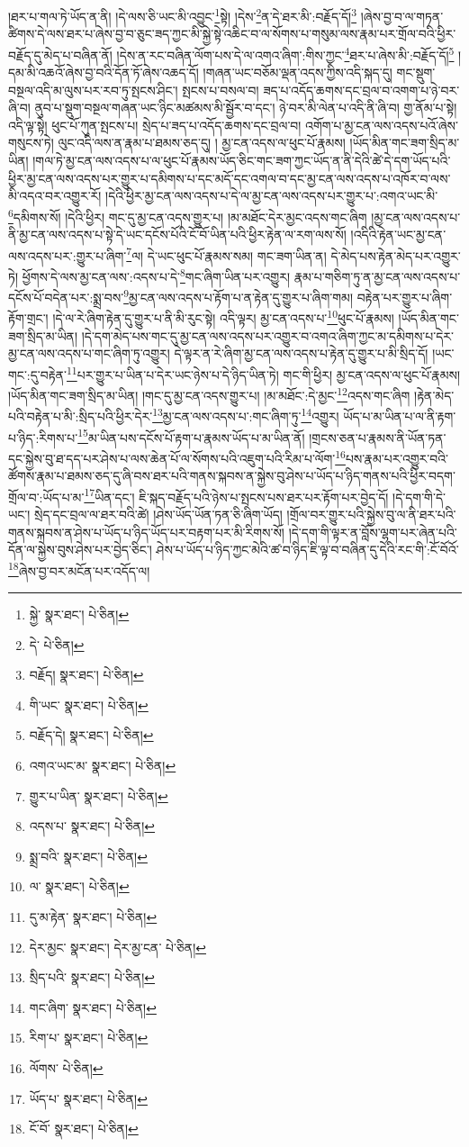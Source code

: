 །ཐར་པ་གལ་ཏེ་ཡོད་ན་ནི། །དེ་ལས་ཅི་ཡང་མི་འབྱུང་\footnote{སྐྱེ་  སྣར་ཐང་།  པེ་ཅིན། }སྟེ། །དེས་\footnote{དེ་  པེ་ཅིན། }ན་དེ་ཐར་མི་:བརྗོད་དོ།\footnote{བརྗོད།  སྣར་ཐང་།  པེ་ཅིན། } །ཞེས་བྱ་བ་ལ་གཏན་ཚིགས་དེ་ལས་ཐར་པ་ཞེས་བྱ་བ་ཅུང་ཟད་ཀྱང་མི་སྐྱེ་སྟེ་འཆིང་བ་ལ་སོགས་པ་གསུམ་ལས་རྣམ་པར་གྲོལ་བའི་ཕྱིར་བརྗོད་དུ་མེད་པ་བཞིན་ནོ། །དེས་ན་རང་བཞིན་ལོག་པས་དེ་ལ་འགའ་ཞིག་:གིས་ཀྱང་\footnote{གི་ཡང་  སྣར་ཐང་།  པེ་ཅིན། }ཐར་པ་ཞེས་མི་:བརྗོད་དོ།\footnote{བརྗོད་དེ།  སྣར་ཐང་།  པེ་ཅིན། } །དམ་མི་འཆའོ་ཞེས་བྱ་བའི་དོན་ཏོ་ཞེས་འཆད་དོ། །གཞན་ཡང་བཅོམ་ལྡན་འདས་ཀྱིས་འདི་སྐད་དུ། གང་སྡུག་བསྔལ་འདི་མ་ལུས་པར་རབ་ཏུ་སྤངས་ཤིང་། སྤངས་པ་བསལ་བ། ཟད་པ་འདོད་ཆགས་དང་བྲལ་བ་འགག་པ་ཉེ་བར་ཞི་བ། ནུབ་པ་སྡུག་བསྔལ་གཞན་ཡང་ཉིང་མཚམས་མི་སྦྱོར་བ་དང་། ཉེ་བར་མི་ལེན་པ་འདི་ནི་ཞི་བ། གྱ་ནོམ་པ་སྟེ། འདི་ལྟ་སྟེ། ཕུང་པོ་ཀུན་སྤངས་པ། སྲེད་པ་ཟད་པ་འདོད་ཆགས་དང་བྲལ་བ། འགོག་པ་མྱ་ངན་ལས་འདས་པའོ་ཞེས་གསུངས་ཏེ། ལུང་འདི་ལས་ན་རྣམ་པ་ཐམས་ཅད་དུ། །
མྱ་ངན་འདས་ལ་ཕུང་པོ་རྣམས། །ཡོད་མིན་གང་ཟག་སྲིད་མ་ཡིན། །གལ་ཏེ་མྱ་ངན་ལས་འདས་པ་ལ་ཕུང་པོ་རྣམས་ཡོད་ཅིང་གང་ཟག་ཀྱང་ཡོད་ན་ནི་དེའི་ཚེ་དེ་དག་ཡོད་པའི་ཕྱིར་མྱ་ངན་ལས་འདས་པར་གྱུར་པ་དམིགས་པ་དང་མདོ་དང་འགལ་བ་དང་མྱ་ངན་ལས་འདས་པ་འཁོར་བ་ལས་མི་འདའ་བར་འགྱུར་རོ། །དེའི་ཕྱིར་མྱ་ངན་ལས་འདས་པ་དེ་ལ་མྱ་ངན་ལས་འདས་པར་གྱུར་པ་:འགའ་ཡང་མི་\footnote{འགའ་ཡང་མ་  སྣར་ཐང་།  པེ་ཅིན། }དམིགས་སོ། །དེའི་ཕྱིར། གང་དུ་མྱ་ངན་འདས་གྱུར་པ། །མ་མཐོང་དེར་མྱང་འདས་གང་ཞིག །མྱ་ངན་ལས་འདས་པ་ནི་མྱ་ངན་ལས་འདས་པ་སྟེ་དེ་ཡང་དངོས་པོའི་ངོ་བོ་ཡིན་པའི་ཕྱིར་རྟེན་ལ་རག་ལས་སོ། །འདིའི་རྟེན་ཡང་མྱ་ངན་ལས་འདས་པར་:གྱུར་པ་ཞིག་\footnote{གྱུར་པ་ཡིན་  སྣར་ཐང་།  པེ་ཅིན། }ལ། དེ་ཡང་ཕུང་པོ་རྣམས་སམ། གང་ཟག་ཡིན་ན། དེ་མེད་པས་རྟེན་མེད་པར་འགྱུར་ཏེ། ཕྱོགས་དེ་ལས་མྱ་ངན་ལས་:འདས་པ་དེ་\footnote{འདས་པ་  སྣར་ཐང་།  པེ་ཅིན། }གང་ཞིག་ཡིན་པར་འགྱུར། རྣམ་པ་གཅིག་ཏུ་ན་མྱ་ངན་ལས་འདས་པ་དངོས་པོ་བདེན་པར་:སྨྲ་བས་\footnote{སྨྲ་བའི་  སྣར་ཐང་།  པེ་ཅིན། }མྱ་ངན་ལས་འདས་པ་རྟོག་པ་ན་རྟེན་དུ་གྱུར་པ་ཞིག་གམ། བརྟེན་པར་གྱུར་པ་ཞིག་རྟོག་གྲང་། །དེ་ལ་རེ་ཞིག་རྟེན་དུ་གྱུར་པ་ནི་མི་རུང་སྟེ། འདི་ལྟར། མྱ་ངན་འདས་པ་\footnote{ལ་  སྣར་ཐང་།  པེ་ཅིན། }ཕུང་པོ་རྣམས། །ཡོད་མིན་གང་ཟག་སྲིད་མ་ཡིན། །དེ་དག་མེད་པས་གང་དུ་མྱ་ངན་ལས་འདས་པར་འགྱུར་བ་འགའ་ཞིག་ཀྱང་མ་དམིགས་པ་དེར་མྱ་ངན་ལས་འདས་པ་གང་ཞིག་ཏུ་འགྱུར། དེ་ལྟར་ན་རེ་ཞིག་མྱ་ངན་ལས་འདས་པ་རྟེན་དུ་གྱུར་པ་མི་སྲིད་དོ། །ཡང་གང་:དུ་བརྟེན་\footnote{དུ་མ་རྟེན་  སྣར་ཐང་།  པེ་ཅིན། }པར་གྱུར་པ་ཡིན་པ་དེར་ཡང་ཉེས་པ་དེ་ཉིད་ཡིན་ཏེ། གང་གི་ཕྱིར། མྱ་ངན་འདས་ལ་ཕུང་པོ་རྣམས། །ཡོད་མིན་གང་ཟག་སྲིད་མ་ཡིན། །གང་དུ་མྱ་ངན་འདས་གྱུར་པ། །མ་མཐོང་:དེ་མྱང་\footnote{དེར་མྱང་  སྣར་ཐང་། དེར་མྱ་ངན་  པེ་ཅིན། }འདས་གང་ཞིག །རྟེན་མེད་པའི་བརྟེན་པ་མི་:སྲིད་པའི་ཕྱིར་དེར་\footnote{སྲིད་པའི་  སྣར་ཐང་།  པེ་ཅིན། }མྱ་ངན་ལས་འདས་པ་:གང་ཞིག་ཏུ་\footnote{གང་ཞིག་  སྣར་ཐང་།  པེ་ཅིན། }འགྱུར། ཡོད་པ་མ་ཡིན་པ་ལ་ནི་རྟག་པ་ཉིད་:རིགས་པ་\footnote{རིག་པ་  སྣར་ཐང་།  པེ་ཅིན། }མ་ཡིན་པས་དངོས་པོ་རྟག་པ་རྣམས་ཡོད་པ་མ་ཡིན་ནོ། །གྲངས་ཅན་པ་རྣམས་ནི་ཡོན་ཏན་དང་སྐྱེས་བུ་ཐ་དད་པར་ཤེས་པ་ལས་ཆེན་པོ་ལ་སོགས་པའི་འཇུག་པའི་རིམ་པ་ལོག་\footnote{ལོགས་  པེ་ཅིན། }པས་རྣམ་པར་འགྱུར་བའི་ཚོགས་རྣམ་པ་ཐམས་ཅད་དུ་ཞི་བས་ཐར་པའི་གནས་སྐབས་ན་སྐྱེས་བུ་ཤེས་པ་ཡོད་པ་ཉིད་གནས་པའི་ཕྱིར་བདག་གྲོལ་བ་:ཡོད་པ་མ་\footnote{ཡོད་པ་  སྣར་ཐང་།  པེ་ཅིན། }ཡིན་དང་། ཇི་སྐད་བརྗོད་པའི་ཉེས་པ་སྤངས་པས་ཐར་པར་རྟོག་པར་བྱེད་དོ། །དེ་དག་གི་དེ་ཡང་། སྲེད་དང་བྲལ་ལ་ཐར་བའི་ཚེ། །ཤེས་ཡོད་ཡོན་ཏན་ཅི་ཞིག་ཡོད། །གྲོལ་བར་གྱུར་པའི་སྐྱེས་བུ་ལ་ནི་ཐར་པའི་གནས་སྐབས་ན་ཤེས་པ་ཡོད་པ་ཉིད་ཡོད་པར་བརྟག་པར་མི་རིགས་སོ། །དེ་དག་གི་ལྟར་ན་བློས་ལྷག་པར་ཞེན་པའི་དོན་ལ་སྐྱེས་བུས་ཤེས་པར་བྱེད་ཅིང་། ཤེས་པ་ཡོད་པ་ཉིད་ཀྱང་མེའི་ཚ་བ་ཉིད་ཇི་ལྟ་བ་བཞིན་དུ་དེའི་རང་གི་:ངོ་བོའོ་\footnote{ངོ་བོ་  སྣར་ཐང་།  པེ་ཅིན། }ཞེས་བྱ་བར་མངོན་པར་འདོད་ལ། 